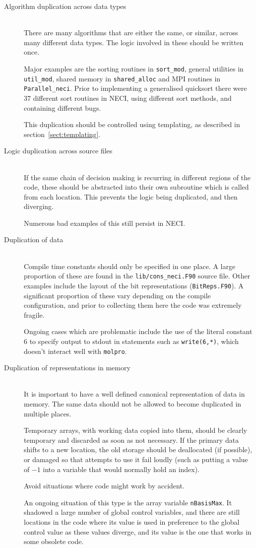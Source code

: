 \documentclass[a4paper,notitlepage,dvipsnames]{scrreprt}
\newcommand\headitem[1]{\needspace{1.5\baselineskip}\item[{\boldmath #1 \nopagebreak}] \hfill \\ \nopagebreak}
\let\code\lstinline
\begin{document}
	\begin{description}
		\headitem{Algorithm duplication across data types}
			There are many algorithms that are either the same, or similar,
			across many different data types. The logic involved in these
			should be written once.

			Major examples are the sorting routines in \code{sort_mod},
			general utilities in \code{util_mod}, shared memory in
			\code{shared_alloc} and MPI routines in
			\code{Parallel_neci}. Prior to implementing a generalised
			quicksort there were 37 different sort routines in NECI, using
			different sort methods, and containing different bugs.

			This duplication should be controlled using templating, as
			described in section~\ref{sect:templating}.

		\headitem{Logic duplication across source files}
			If the same chain of decision making is recurring in different
			regions of the code, these should be abstracted into their own
			subroutine which is called from each location. This prevents the
			logic being duplicated, and then diverging.

			Numerous bad examples of this still persist in NECI.

		\headitem{Duplication of data}
			Compile time constants should only be specified in one place. A
			large proportion of these are found in the
			\code{lib/cons_neci.F90} source file. Other examples include
			the layout of the bit representations (\code{BitReps.F90}).
			A significant proportion of these vary depending on the compile
			configuration, and prior to collecting them here the code was
			extremely fragile.

			Ongoing cases which are problematic include the use of the literal
			constant $6$ to specify output to stdout in statements such as
			\code{write(6,*)}, which doesn't interact well with
			\code{molpro}.

		\headitem{Duplication of representations in memory}
			It is important to have a well defined canonical representation of
			data in memory. The same data should not be allowed to become
			duplicated in multiple places.

			Temporary arrays, with working data copied into them, should be
			clearly temporary and discarded as soon as not necessary. If the
			primary data shifts to a new location, the old storage should be
			deallocated (if possible), or damaged so that attempts to use it
			fail loudly (such as putting a value of $-1$ into a variable that
			would normally hold an index).

			Avoid situations where code might work by accident.

			An ongoing situation of this type is the array variable
			\code{nBasisMax}. It shadowed a large number of global control
			variables, and there are still locations in the code where its
			value is used in preference to the global control value as these
			values diverge, and its value is the one that works in some
			obsolete code.
	\end{description}
\end{document}
